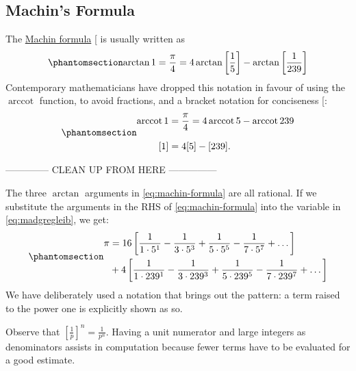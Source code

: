 \documentclass[
  a4paper,
]{article}
\DeclareMathOperator{\arccot}{arccot}
\begin{document}
\subsection{}\label{section}

\subsection{Machin's Formula}\label{machins-formula}

The \href{https://en.wikipedia.org/wiki/Machin-like_formula2}{Machin
formula} {[}\citeproc{ref-schwartz-2012}{22}{]} is usually written as
\begin{equation}\phantomsection\label{eq:machin-formula}{
\arctan{1} = \frac{\pi}{4} = 4\arctan\left[ \frac{1}{5} \right] - \arctan\left[ \frac{1}{239} \right]
}\end{equation} Contemporary mathematicians have dropped this notation
in favour of using the \(\arccot\) function, to avoid fractions, and a
bracket notation for conciseness {[}\citeproc{ref-lehmer-1938}{23}{]}:
\begin{equation}\phantomsection\label{eq:machin-formula-cot}{
\begin{aligned}
\arccot{1} &= \frac{\pi}{4} = 4\arccot{5} - \arccot{239}\\[0.75em]
[1] &= 4[5] - [239].
\end{aligned}
}\end{equation}

-------------- CLEAN UP FROM HERE ---------------

The three \(\arctan\) arguments in \cref{eq:machin-formula} are all
rational. If we substitute the arguments in the RHS of
\cref{eq:machin-formula} into the variable in \cref{eq:madgregleib}, we
get: \begin{equation}\phantomsection\label{eq:machin-pi-series}{
\begin{aligned}
\pi &= 16\left[\frac{1}{1\cdot5^1} - \frac{1}{3\cdot5^3} + \frac{1}{5\cdot5^5} - \frac{1}{7\cdot5^7} + \dots \right]\\
&+ 4\left[\frac{1}{1\cdot239^1} - \frac{1}{3\cdot239^3} + \frac{1}{5\cdot239^5} - \frac{1}{7\cdot239^7} + \dots \right]
\end{aligned}
}\end{equation} We have deliberately used a notation that brings out the
pattern: a term raised to the power one is explicitly shown as so.

Observe that \(\left[{\frac{1}{p}}\right]^n = \frac{1}{p^n}\). Having a
unit numerator and large integers as denominators assists in computation
because fewer terms have to be evaluated for a good estimate.
\end{document}
